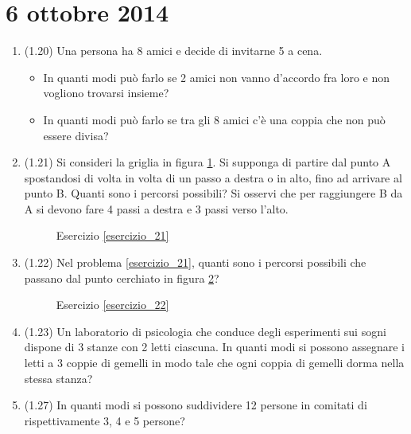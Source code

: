 \section{6 ottobre 2014}

\begin{enumerate}
    \item (1.20) Una persona ha 8 amici e decide di invitarne 5 a cena.
    \begin{itemize}
        \item In quanti modi pu\`o farlo se 2 amici non vanno d'accordo fra loro e non vogliono trovarsi insieme?
        \item In quanti modi pu\`o farlo se tra gli 8 amici c'\`e una coppia che non pu\`o essere divisa?
    \end{itemize}
    \item \label{esercizio_21} (1.21) Si consideri la griglia in figura \ref{fig:esercizio_21}. Si supponga di partire dal punto A spostandosi di volta in volta di un passo a destra o in alto, fino ad arrivare al punto B. Quanti sono i percorsi possibili? Si osservi che per raggiungere B da A si devono fare 4 passi a destra e 3 passi verso l'alto.
    \begin{figure}[ht]
    \centering
    \caption{\label{fig:esercizio_21}Esercizio \ref{esercizio_21}}
    \end{figure}
    \item \label{esercizio_22} (1.22) Nel problema \ref{esercizio_21}, quanti sono i percorsi possibili che passano dal punto cerchiato in figura \ref{fig:esercizio_22}?
    \begin{figure}[ht]
    \centering
    \caption{\label{fig:esercizio_22}Esercizio \ref{esercizio_22}}
    \end{figure}
    \item (1.23) Un laboratorio di psicologia che conduce degli esperimenti sui sogni dispone di 3 stanze con 2 letti ciascuna. In quanti modi si possono assegnare i letti a 3 coppie di gemelli in modo tale che ogni coppia di gemelli dorma nella stessa stanza?
    \item (1.27) In quanti modi si possono suddividere 12 persone in comitati di rispettivamente 3, 4 e 5 persone?
\end{enumerate}